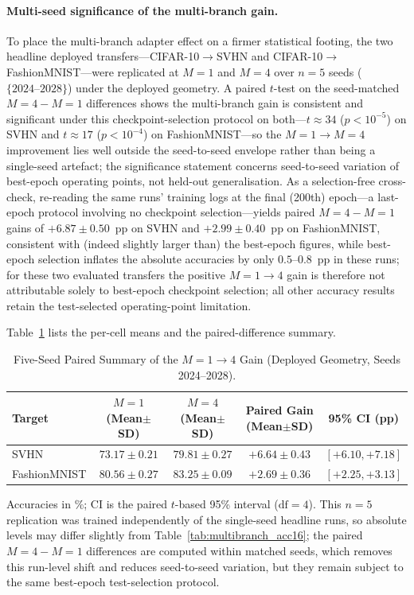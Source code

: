 \documentclass[12pt, a4paper]{report}
\numberwithin{equation}{chapter}
\numberwithin{figure}{chapter}
\numberwithin{table}{chapter}
\numberwithin{algorithm}{chapter}
\begin{document}
\paragraph{Multi-seed significance of the multi-branch gain.} To place the multi-branch adapter effect on a firmer statistical footing, the two headline deployed transfers---CIFAR-10$\to$SVHN and CIFAR-10$\to$FashionMNIST---were replicated at $M{=}1$ and $M{=}4$ over $n=5$ seeds ($\{2024\text{--}2028\}$) under the deployed geometry. A paired $t$-test on the seed-matched $M{=}4-M{=}1$ differences shows the multi-branch gain is consistent and significant under this checkpoint-selection protocol on both---$t \approx 34$ ($p<10^{-5}$) on SVHN and $t \approx 17$ ($p<10^{-4}$) on FashionMNIST---so the $M{=}1\to M{=}4$ improvement lies well outside the seed-to-seed envelope rather than being a single-seed artefact; the significance statement concerns seed-to-seed variation of best-epoch operating points, not held-out generalisation. As a selection-free cross-check, re-reading the same runs' training logs at the final (200th) epoch---a last-epoch protocol involving no checkpoint selection---yields paired $M{=}4-M{=}1$ gains of $+6.87 \pm 0.50$~pp on SVHN and $+2.99 \pm 0.40$~pp on FashionMNIST, consistent with (indeed slightly larger than) the best-epoch figures, while best-epoch selection inflates the absolute accuracies by only $0.5$--$0.8$~pp in these runs; for these two evaluated transfers the positive $M{=}1{\to}4$ gain is therefore not attributable solely to best-epoch checkpoint selection; all other accuracy results retain the test-selected operating-point limitation.

Table~\ref{tab:multiseed_mb} lists the per-cell means and the paired-difference summary.

\begin{table}[H]
\centering
\caption{Five-Seed Paired Summary of the $M{=}1{\to}4$ Gain (Deployed Geometry, Seeds 2024--2028).}
\label{tab:multiseed_mb}
\small
\begin{tabular}{lcccc}
\toprule
\textbf{Target} & \textbf{$M{=}1$ (Mean$\pm$SD)} & \textbf{$M{=}4$ (Mean$\pm$SD)} & \textbf{Paired Gain (Mean$\pm$SD)} & \textbf{95\% CI (pp)} \\
\midrule
SVHN & $73.17 \pm 0.21$ & $79.81 \pm 0.27$ & $+6.64 \pm 0.43$ & $[+6.10, +7.18]$ \\
FashionMNIST & $80.56 \pm 0.27$ & $83.25 \pm 0.09$ & $+2.69 \pm 0.36$ & $[+2.25, +3.13]$ \\
\bottomrule
\end{tabular}
\begin{flushleft}
\footnotesize Accuracies in \%; CI is the paired $t$-based 95\% interval ($\mathrm{df}=4$). This $n{=}5$ replication was trained independently of the single-seed headline runs, so absolute levels may differ slightly from Table~\ref{tab:multibranch_acc16}; the paired $M{=}4{-}M{=}1$ differences are computed within matched seeds, which removes this run-level shift and reduces seed-to-seed variation, but they remain subject to the same best-epoch test-selection protocol.
\end{flushleft}
\end{table}
\end{document}
